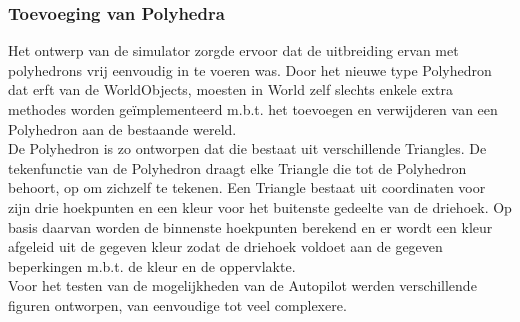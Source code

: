 \subsubsection{Toevoeging van Polyhedra}

Het ontwerp van de simulator zorgde ervoor dat de uitbreiding ervan met polyhedrons vrij eenvoudig in te voeren was. Door het nieuwe type Polyhedron dat erft van de WorldObjects, moesten in World zelf slechts enkele extra methodes worden ge\"implementeerd m.b.t. het toevoegen en verwijderen van een Polyhedron aan de bestaande wereld.\\

\noindent 
De Polyhedron is zo ontworpen dat die bestaat uit verschillende Triangles. De tekenfunctie van de Polyhedron draagt elke Triangle die tot de Polyhedron behoort, op om zichzelf te tekenen. Een Triangle bestaat uit coordinaten voor zijn drie hoekpunten en een kleur voor het buitenste gedeelte van de driehoek. Op basis daarvan worden de binnenste hoekpunten berekend en er wordt een kleur afgeleid uit de gegeven kleur zodat de driehoek voldoet aan de gegeven beperkingen m.b.t. de kleur en de oppervlakte.\\
\noindent
Voor het testen van de mogelijkheden van de Autopilot werden verschillende figuren ontworpen, van eenvoudige tot veel complexere.
